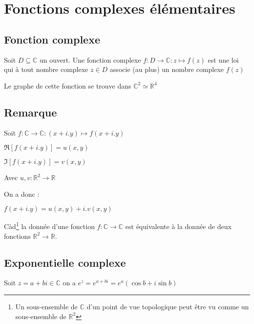 \documentclass[a4paper,10pt]{report}
\newcommand{\ap}{\rightarrow}
\newcommand{\R}{\mathbb{R}}
\newcommand{\C}{\mathbb{C}}
\begin{document}
\section{Fonctions complexes élémentaires}

\subsection{Fonction complexe}

Soit $D \subseteq \C$ un ouvert. Une fonction complexe $f : D \ap \C : z
\mapsto f(z)$ est une loi qui à tout nombre complexe $z \in D$ associe (au plus) un nombre complexe $f(z)$

Le graphe de cette fonction se trouve dans $\C^2 \simeq \R^4$


\subsection{Remarque}

Soit $f: \C \ap \C : (x + i.y) \mapsto f(x+i.y)$

$\Re [f(x+i.y)] = u(x,y)$

$\Im [f(x+i.y)] = v(x,y)$

Avec $u,v : \R^2 \ap \R$

On a donc :

$f(x + i.y) = u(x,y) + i.v(x,y)$

Càd\footnote{Un sous-ensemble de $\C$ d'un point de vue topologique peut être vu comme un sous-ensemble de $\R^2$} la donnée d'une fonction $f: \C \ap \C$ est équivalente à la donnée de deux fonctions $\R^2 \ap \R$.


\subsection{Exponentielle complexe}

Soit $z = a+bi \in \C$ on a $e^z = e^{a+bi} = e^a(\cos b + i \sin b)$
\end{document}
